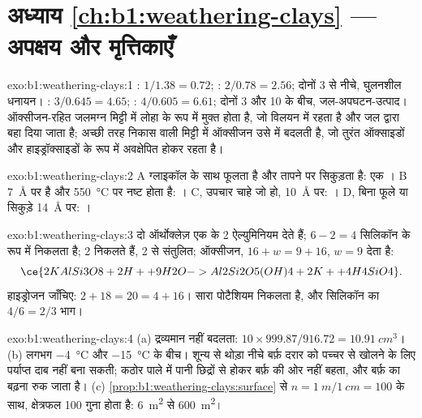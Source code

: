 \section*{अध्याय \ref{ch:b1:weathering-clays} --- अपक्षय और मृत्तिकाएँ}

\begin{solution}{exo:b1:weathering-clays:1}
: $1/1.38 = 0.72$; : $2/0.78 = 2.56$; दोनों 3 से नीचे, घुलनशील धनायन। : $3/0.645 = 4.65$; : $4/0.605 = 6.61$; दोनों 3 और 10 के बीच, जल-अपघटन-उत्पाद। ऑक्सीजन-रहित जलमग्न मिट्टी में लोहा  के रूप में मुक्त होता है, जो विलयन में रहता है और जल द्वारा बहा दिया जाता है; अच्छी तरह निकास वाली मिट्टी में ऑक्सीजन उसे  में बदलती है, जो तुरंत ऑक्साइडों और हाइड्रॉक्साइडों के रूप में अवक्षेपित होकर रहता है।
\end{solution}

\begin{solution}{exo:b1:weathering-clays:2}
A ग्लाइकॉल के साथ फूलता है और तापने पर सिकुड़ता है: एक । B \SI{7}{\angstrom} पर है और \SI{550}{\celsius} पर नष्ट होता है: । C, उपचार चाहे जो हो, \SI{10}{\angstrom} पर: । D, बिना फूले या सिकुड़े \SI{14}{\angstrom} पर: ।
\end{solution}

\begin{solution}{exo:b1:weathering-clays:3}
दो ऑर्थोक्लेज़ एक  के 2 ऐल्युमिनियम देते हैं; $6 - 2 = 4$ सिलिकॉन  के रूप में निकलता है; 2  निकलते हैं, 2  से संतुलित; ऑक्सीजन, $16 + w = 9 + 16$, $w = 9$ देता है:
\[
  \ce{2 KAlSi3O8 + 2 H+ + 9 H2O -> Al2Si2O5(OH)4 + 2 K+ + 4 H4SiO4}.
\]
हाइड्रोजन जाँचिए: $2 + 18 = 20 = 4 + 16$। सारा पोटैशियम निकलता है, और सिलिकॉन का $4/6 =
2/3$ भाग।
\end{solution}

\begin{solution}{exo:b1:weathering-clays:4}
(a) द्रव्यमान नहीं बदलता: $10 \times 999.87/916.72 = \qty{10.91}{cm^3}$।
(b) लगभग \qty{-4}{\celsius} और \qty{-15}{\celsius} के बीच। शून्य से थोड़ा नीचे बर्फ़ दरार को पच्चर से खोलने के लिए पर्याप्त दाब नहीं बना सकती; कठोर पाले में पानी छिद्रों से होकर बर्फ़ की ओर नहीं बहता, और बर्फ़ का बढ़ना रुक जाता है। (c) \cref{prop:b1:weathering-clays:surface} से $n = \qty{1}{m}/\qty{1}{cm} = 100$ के साथ, क्षेत्रफल 100 गुना होता है: \qty{6}{m^2} से \qty{600}{m^2}।
\end{solution}

